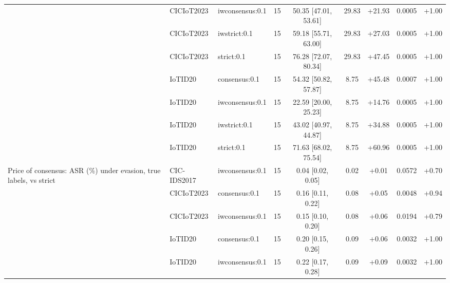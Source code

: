 \begin{table}[t]
\begin{tabular}{lllcccccc}
 & CICIoT2023 & iwconsensus:0.1 & 15 & 50.35 [47.01, 53.61] & 29.83 & +21.93 & 0.0005 & +1.00 \\
 & CICIoT2023 & iwstrict:0.1 & 15 & 59.18 [55.71, 63.00] & 29.83 & +27.03 & 0.0005 & +1.00 \\
 & CICIoT2023 & strict:0.1 & 15 & 76.28 [72.07, 80.34] & 29.83 & +47.45 & 0.0005 & +1.00 \\
 & IoTID20 & consensus:0.1 & 15 & 54.32 [50.82, 57.87] & 8.75 & +45.48 & 0.0007 & +1.00 \\
 & IoTID20 & iwconsensus:0.1 & 15 & 22.59 [20.00, 25.23] & 8.75 & +14.76 & 0.0005 & +1.00 \\
 & IoTID20 & iwstrict:0.1 & 15 & 43.02 [40.97, 44.87] & 8.75 & +34.88 & 0.0005 & +1.00 \\
 & IoTID20 & strict:0.1 & 15 & 71.63 [68.02, 75.54] & 8.75 & +60.96 & 0.0005 & +1.00 \\
Price of consensus: ASR (\%) under evasion, true labels, vs strict & CIC-IDS2017 & iwconsensus:0.1 & 15 & 0.04 [0.02, 0.05] & 0.02 & +0.01 & 0.0572 & +0.70 \\
 & CICIoT2023 & consensus:0.1 & 15 & 0.16 [0.11, 0.22] & 0.08 & +0.05 & 0.0048 & +0.94 \\
 & CICIoT2023 & iwconsensus:0.1 & 15 & 0.15 [0.10, 0.20] & 0.08 & +0.06 & 0.0194 & +0.79 \\
 & IoTID20 & consensus:0.1 & 15 & 0.20 [0.15, 0.26] & 0.09 & +0.06 & 0.0032 & +1.00 \\
 & IoTID20 & iwconsensus:0.1 & 15 & 0.22 [0.17, 0.28] & 0.09 & +0.09 & 0.0032 & +1.00 \\
\bottomrule
\end{tabular}
\end{table}
